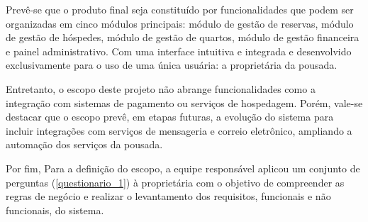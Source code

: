 \documentclass[
	12pt,				%
	openany,			%
	twoside,			%
	a4paper,			%
	english,			%
	french,				%
	spanish,			%
	brazil				%
	]{abntex2}
\begin{document}
Prevê-se que o produto final seja constituído por funcionalidades que podem ser organizadas em cinco módulos principais: módulo de gestão de reservas, módulo de gestão de hóspedes, módulo de gestão de quartos, módulo de gestão financeira e painel administrativo. Com uma interface intuitiva e integrada e desenvolvido exclusivamente para o uso de uma única usuária: a proprietária da pousada.

Entretanto, o escopo deste projeto não abrange funcionalidades como a integração com sistemas de pagamento ou serviços de hospedagem. Porém, vale-se destacar que o escopo prevê, em etapas futuras, a evolução do sistema para incluir integrações com serviços de mensageria e correio eletrônico, ampliando a automação dos serviços da pousada.

Por fim, Para a definição do escopo, a equipe responsável aplicou um conjunto de perguntas (\autoref{questionario_1}) à proprietária com o objetivo de compreender as regras de negócio e realizar o levantamento dos requisitos, funcionais e não funcionais, do sistema. 
\end{document}
